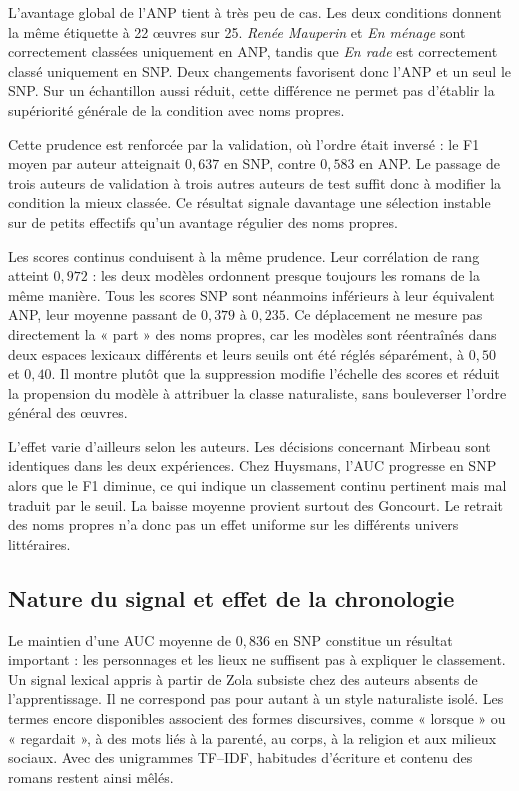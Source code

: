 L'avantage global de l'ANP tient à très peu de cas. Les deux conditions donnent la même étiquette à 22 œuvres sur 25. \textit{Renée Mauperin} et \textit{En ménage} sont correctement classées uniquement en ANP, tandis que \textit{En rade} est correctement classé uniquement en SNP. Deux changements favorisent donc l'ANP et un seul le SNP. Sur un échantillon aussi réduit, cette différence ne permet pas d'établir la supériorité générale de la condition avec noms propres.

Cette prudence est renforcée par la validation, où l'ordre était inversé : le F1 moyen par auteur atteignait $0{,}637$ en SNP, contre $0{,}583$ en ANP. Le passage de trois auteurs de validation à trois autres auteurs de test suffit donc à modifier la condition la mieux classée. Ce résultat signale davantage une sélection instable sur de petits effectifs qu'un avantage régulier des noms propres.

Les scores continus conduisent à la même prudence. Leur corrélation de rang atteint $0{,}972$ : les deux modèles ordonnent presque toujours les romans de la même manière. Tous les scores SNP sont néanmoins inférieurs à leur équivalent ANP, leur moyenne passant de $0{,}379$ à $0{,}235$. Ce déplacement ne mesure pas directement la « part » des noms propres, car les modèles sont réentraînés dans deux espaces lexicaux différents et leurs seuils ont été réglés séparément, à $0{,}50$ et $0{,}40$. Il montre plutôt que la suppression modifie l'échelle des scores et réduit la propension du modèle à attribuer la classe naturaliste, sans bouleverser l'ordre général des œuvres.

L'effet varie d'ailleurs selon les auteurs. Les décisions concernant Mirbeau sont identiques dans les deux expériences. Chez Huysmans, l'AUC progresse en SNP alors que le F1 diminue, ce qui indique un classement continu pertinent mais mal traduit par le seuil. La baisse moyenne provient surtout des Goncourt. Le retrait des noms propres n'a donc pas un effet uniforme sur les différents univers littéraires.

\subsection{Nature du signal et effet de la chronologie}

Le maintien d'une AUC moyenne de $0{,}836$ en SNP constitue un résultat important : les personnages et les lieux ne suffisent pas à expliquer le classement. Un signal lexical appris à partir de Zola subsiste chez des auteurs absents de l'apprentissage. Il ne correspond pas pour autant à un style naturaliste isolé. Les termes encore disponibles associent des formes discursives, comme « lorsque » ou « regardait », à des mots liés à la parenté, au corps, à la religion et aux milieux sociaux. Avec des unigrammes TF--IDF, habitudes d'écriture et contenu des romans restent ainsi mêlés.

